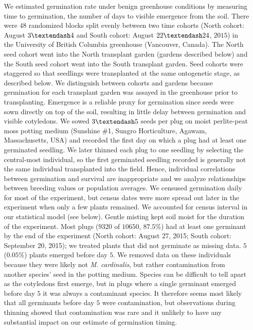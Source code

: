 \documentclass[
  12pt,
]{article}
\begin{document}
We estimated germination rate under benign greenhouse conditions by measuring time to germination, the number of days to visible emergence from the soil. There were \(48\) randomized blocks split evenly between two time cohorts (North cohort: August \(3 \textendash 4\) and South cohort: August \(22 \textendash 24\), \(2015\)) in the University of British Columbia greenhouse (Vancouver, Canada). The North seed cohort went into the North transplant garden (gardens described below) and the South seed cohort went into the South transplant garden. Seed cohorts were staggered so that seedlings were transplanted at the same ontogenetic stage, as described below. We distinguish between cohorts and gardens because germination for each transplant garden was assayed in the greenhouse prior to transplanting. Emergence is a reliable proxy for germination since seeds were sown directly on top of the soil, resulting in little delay between germination and visible cotyledons. We sowed \(3 \textendash 5\) seeds per plug on moist perlite-peat moss potting medium (Sunshine \#1, Sungro Horticulture, Agawam, Massachusetts, USA) and recorded the first day on which a plug had at least one germinated seedling. We later thinned each plug to one seedling by selecting the central-most individual, so the first germinated seedling recorded is generally not the same individual transplanted into the field. Hence, individual correlations between germination and survival are inappropriate and we analyze relationships between breeding values or population averages. We censused germination daily for most of the experiment, but census dates were more spread out later in the experiment when only a few plants remained. We accounted for census interval in our statistical model (see below). Gentle misting kept soil moist for the duration of the experiment. Most plugs (\(9320\) of \(10650\), \(87.5\)\%) had at least one germinant by the end of the experiment (North cohort: August 27, 2015; South cohort: September 20, 2015); we treated plants that did not germinate as missing data. \(5\) (\(0.05\)\%) plants emerged before day \(5\). We removed data on these individuals because they were likely not \emph{M. cardinalis}, but rather contamination from another species' seed in the potting medium. Species can be difficult to tell apart as the cotyledons first emerge, but in plugs where a single germinant emerged before day \(5\) it was always a contaminant species. It therefore seems most likely that all germinants before day \(5\) were contamination, but observations during thinning showed that contamination was rare and it unlikely to have any substantial impact on our estimate of germination timing.
\end{document}

